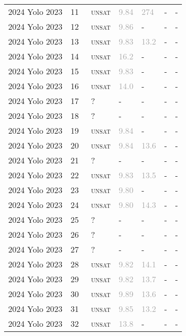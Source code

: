 \begin{center}
{\begin{longtable}{@{}lllllll@{}}
2024 Yolo 2023 & 11 & ~\textsc{unsat} & \textcolor{darkgray}{9.84} & \textcolor{darkgray}{274} & - & - \\
2024 Yolo 2023 & 12 & ~\textsc{unsat} & \textcolor{darkgray}{9.86} & - & - & - \\
2024 Yolo 2023 & 13 & ~\textsc{unsat} & \textcolor{darkgray}{9.83} & \textcolor{darkgray}{13.2} & - & - \\
2024 Yolo 2023 & 14 & ~\textsc{unsat} & \textcolor{darkgray}{16.2} & - & - & - \\
2024 Yolo 2023 & 15 & ~\textsc{unsat} & \textcolor{darkgray}{9.83} & - & - & - \\
2024 Yolo 2023 & 16 & ~\textsc{unsat} & \textcolor{darkgray}{14.0} & - & - & - \\
2024 Yolo 2023 & 17 & ~? & - & - & - & - \\
2024 Yolo 2023 & 18 & ~? & - & - & - & - \\
2024 Yolo 2023 & 19 & ~\textsc{unsat} & \textcolor{darkgray}{9.84} & - & - & - \\
2024 Yolo 2023 & 20 & ~\textsc{unsat} & \textcolor{darkgray}{9.84} & \textcolor{darkgray}{13.6} & - & - \\
2024 Yolo 2023 & 21 & ~? & - & - & - & - \\
2024 Yolo 2023 & 22 & ~\textsc{unsat} & \textcolor{darkgray}{9.83} & \textcolor{darkgray}{13.5} & - & - \\
2024 Yolo 2023 & 23 & ~\textsc{unsat} & \textcolor{darkgray}{9.80} & - & - & - \\
2024 Yolo 2023 & 24 & ~\textsc{unsat} & \textcolor{darkgray}{9.80} & \textcolor{darkgray}{14.3} & - & - \\
2024 Yolo 2023 & 25 & ~? & - & - & - & - \\
2024 Yolo 2023 & 26 & ~? & - & - & - & - \\
2024 Yolo 2023 & 27 & ~? & - & - & - & - \\
2024 Yolo 2023 & 28 & ~\textsc{unsat} & \textcolor{darkgray}{9.82} & \textcolor{darkgray}{14.1} & - & - \\
2024 Yolo 2023 & 29 & ~\textsc{unsat} & \textcolor{darkgray}{9.82} & \textcolor{darkgray}{13.7} & - & - \\
2024 Yolo 2023 & 30 & ~\textsc{unsat} & \textcolor{darkgray}{9.89} & \textcolor{darkgray}{13.6} & - & - \\
2024 Yolo 2023 & 31 & ~\textsc{unsat} & \textcolor{darkgray}{9.85} & \textcolor{darkgray}{13.2} & - & - \\
2024 Yolo 2023 & 32 & ~\textsc{unsat} & \textcolor{darkgray}{13.8} & - & - & - \\

\end{longtable}}
\end{center}
